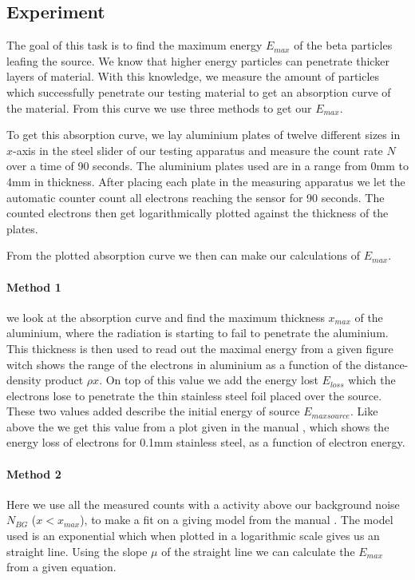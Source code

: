 \subsection{Experiment}

The goal of this task is to find the maximum energy $E_{max}$ of the beta particles leafing the source.
We know that higher energy particles can penetrate thicker layers of material.
With this knowledge, we measure the amount of particles which successfully penetrate our testing material to get an absorption curve of the material.
From this curve we use three methods to get our $E_{max}$.


To get this absorption curve, we lay aluminium plates of twelve different sizes in $x$-axis in the steel slider of our testing apparatus and measure the count rate $N$ over a time of 90 seconds.
The aluminium plates used are in a range from 0mm to 4mm in thickness.
After placing each plate in the measuring apparatus we let the automatic counter count all electrons reaching the sensor for 90 seconds. 
The counted electrons then get logarithmically plotted against the thickness of the plates.


From the plotted absorption curve we then can make our calculations of $E_{max}$.
\paragraph{Method 1} we look at the absorption curve and find the maximum thickness $x_{max}$ of the aluminium, where the radiation is starting to fail to penetrate the aluminium.
This thickness is then used to read out the maximal energy from a given figure \cite{manual} witch shows the range of the electrons in aluminium as a function of the distance-density product $\rho x$.
On top of this value we add the energy lost $E_{loss}$ which the electrons lose to penetrate the thin stainless steel foil placed over the source.
These two values added describe the initial energy of source  $E_{maxsource}$.
Like above the we get this value from a plot given in the manual \cite{manual}, which shows the energy loss of electrons for 0.1\si{\mm} stainless steel, as a function of electron energy.

\paragraph{Method 2} Here we use all the measured counts with a activity above our background noise $N_{BG}$ ($x<x_{max}$), to make a fit on a giving model from the manual \cite{manual}.
The model used is an exponential which when plotted in a logarithmic scale gives us an straight line. 
Using the slope $\mu$ of the straight line we can calculate the $E_{max}$ from a given equation.

